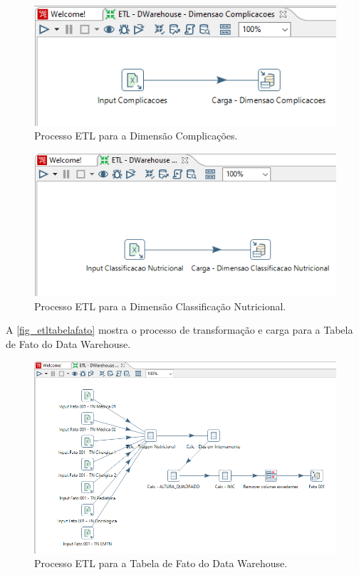 \begin{figure}[htb]
	\caption{\label{fig_etldimensaocomplicacoes}Processo ETL para a Dimensão Complicações.}
	\begin{center}
	    \includegraphics[scale=0.72]{Imagens/figura - etl dw complicacoes.png}
	\end{center}
\end{figure}
                \clearpage
\begin{figure}[htb]
	\caption{\label{fig_etldimensaoclassificacao}Processo ETL para a Dimensão Classificação Nutricional.}
	\begin{center}
	    \includegraphics[scale=0.8]{Imagens/figura - etl dw classificacao.png}
	\end{center}
\end{figure}
A \autoref{fig_etltabelafato} mostra o processo de transformação e carga para a Tabela de Fato do Data Warehouse. 
\begin{figure}[htb]
	\caption{\label{fig_etltabelafato}Processo ETL para a Tabela de Fato do Data Warehouse.}
	\begin{center}
	    \includegraphics[scale=0.7]{Imagens/figura - etl dw fato.png}
	\end{center}
\end{figure}

